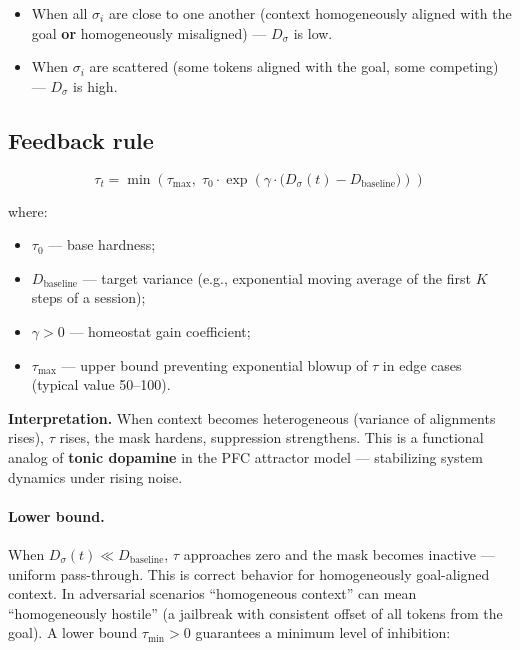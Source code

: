 \documentclass[12pt,a4paper]{article}
\begin{document}
\begin{itemize}
    \item When all $\sigma_i$ are close to one another (context homogeneously aligned with the goal \textbf{or} homogeneously misaligned) --- $D_\sigma$ is low.
    \item When $\sigma_i$ are scattered (some tokens aligned with the goal, some competing) --- $D_\sigma$ is high.
\end{itemize}

\subsection{Feedback rule}

\begin{equation}
\boxed{
\tau_t = \min\!\left(\tau_{\max}, \; \tau_0 \cdot \exp\!\left(\gamma \cdot \bigl(D_\sigma(t) - D_{\text{baseline}}\bigr)\right)\right)
}
\end{equation}

where:

\begin{itemize}
    \item $\tau_0$ --- base hardness;
    \item $D_{\text{baseline}}$ --- target variance (e.g., exponential moving average of the first $K$ steps of a session);
    \item $\gamma > 0$ --- homeostat gain coefficient;
    \item $\tau_{\max}$ --- upper bound preventing exponential blowup of $\tau$ in edge cases (typical value 50--100).
\end{itemize}

\textbf{Interpretation.} When context becomes heterogeneous (variance of alignments rises), $\tau$ rises, the mask hardens, suppression strengthens. This is a functional analog of \textbf{tonic dopamine} in the PFC attractor model --- stabilizing system dynamics under rising noise.

\paragraph{Lower bound.} When $D_\sigma(t) \ll D_{\text{baseline}}$, $\tau$ approaches zero and the mask becomes inactive --- uniform pass-through. This is correct behavior for homogeneously goal-aligned context. In adversarial scenarios ``homogeneous context'' can mean ``homogeneously hostile'' (a jailbreak with consistent offset of all tokens from the goal). A lower bound $\tau_{\min} > 0$ guarantees a minimum level of inhibition:
\end{document}

